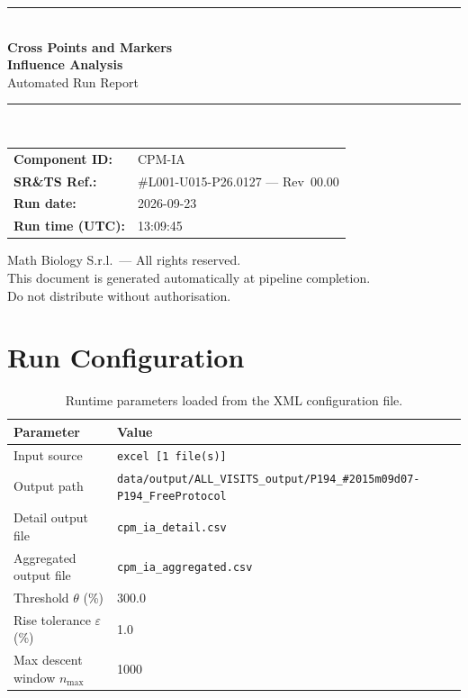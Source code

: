 \documentclass[a4paper,11pt]{article}
\begin{document}
\begin{titlepage}
\begin{center}
  \vspace*{1.8cm}
  {\color{dmaaccent}\rule{\linewidth}{1.5pt}}\\[0.6cm]
  {\LARGE\bfseries\color{dmaaccent}
    Cross Points and Markers\\[0.25cm]
    Influence Analysis}\\[0.4cm]
  {\Large Automated Run Report}\\[0.3cm]
  {\color{dmaaccent}\rule{\linewidth}{1.5pt}}\\[2cm]

  \begin{tabular}{ll}
    \textbf{Component ID:}   & CPM-IA \\[0.3cm]
    \textbf{SR\&TS Ref.:}    & \#L001-U015-P26.0127 --- Rev~00.00 \\[0.3cm]
    \textbf{Run date:}       & 2026-09-23 \\[0.3cm]
    \textbf{Run time (UTC):} & 13:09:45 \\
  \end{tabular}

  \vfill
  {\color{dmagray}\small
    Math Biology S.r.l.\ --- All rights reserved.\\
    This document is generated automatically at pipeline completion.\\
    Do not distribute without authorisation.}
\end{center}
\end{titlepage}

\tableofcontents
\clearpage

\section{Run Configuration}

\begin{table}[h!]
\centering
\small
\caption{Runtime parameters loaded from the XML configuration file.}
\begin{tabular}{ll}
\toprule
\textbf{Parameter} & \textbf{Value} \\
\midrule
Input source                      & \texttt{excel [1 file(s)]} \\
Output path                       & \texttt{data/output/ALL\_VISITS\_output/P194\_\#2015m09d07-P194\_FreeProtocol} \\
Detail output file                & \texttt{cpm\_ia\_detail.csv} \\
Aggregated output file            & \texttt{cpm\_ia\_aggregated.csv} \\
Threshold $\theta$ (\%)           & 300.0 \\
Rise tolerance $\varepsilon$ (\%) & 1.0 \\
Max descent window $n_{\max}$     & 1000 \\
\bottomrule
\end{tabular}
\end{table}
\end{document}
